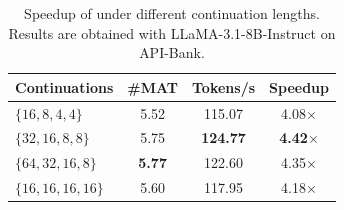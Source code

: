\begin{table}[t]
\centering
\small
\begin{tabular}{@{}l|ccc@{}}
\toprule
\bf Continuations &\#MAT &Tokens/s & Speedup \\\midrule
$\{16, 8, 4, 4\}$ & 5.52 & 115.07 & 4.08$\times$  \\
$\{32, 16, 8, 8\}$ & 5.75 & \bf{124.77} & \bf{4.42$\times$} \\
$\{64, 32, 16, 8\}$ & \bf{5.77} & 122.60 & 4.35$\times$ \\
$\{16, 16, 16, 16\}$ & 5.60 & 117.95 & 4.18$\times$  \\
\bottomrule
\end{tabular}
\caption{Speedup of \method under different continuation lengths. Results are obtained with LLaMA-3.1-8B-Instruct on API-Bank.}
\label{tab:continuation}
\end{table}